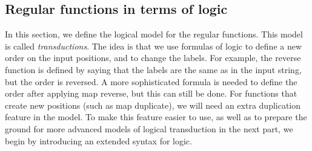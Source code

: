 \subsection{Regular functions in terms of logic}
\label{sec:mso-transductions}
In this section, we define the logical model for the regular functions. This model is called \emph{\mso transductions}. The idea is that we use formulas of \mso logic to define a new order on the input positions, and to change the labels. For example, the reverse function is defined by saying that the labels are the same as in the input string, but the order is reversed. A more sophisticated formula is needed to define the order after applying map reverse, but this can still be done. For functions that create new positions (such as map duplicate), we will need an extra duplication feature in the model. To make this feature easier to use, as well as to prepare the ground for more advanced models  of logical transduction in the next part, we begin by introducing an extended syntax for \mso logic. 

